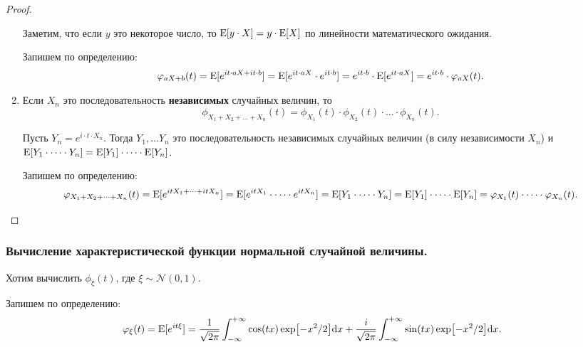 \begin{proof}
\begin{enumerate}
        Заметим, что если $y$ это некоторое число, то $\operatorname{E}[y \cdot X] = y \cdot \operatorname{E}[X]$ по линейности математического ожидания.

        Запишем по определению:
        \begin{align*}
            \varphi_{aX + b}(t)
            = \operatorname{E}[e^{it \cdot aX + it \cdot b}]
            = \operatorname{E}[e^{it \cdot aX} \cdot e^{it \cdot b}]
            = e^{it \cdot b} \cdot \operatorname{E}[e^{it \cdot aX}]
            = e^{it \cdot b} \cdot \varphi_{aX}(t).
        \end{align*}

    \item 
        Если $X_n$ это последовательность \textbf{независимых} случайных величин, то
        \begin{equation*}
            \phi_{X_1 + X_2 + \dots + X_n}(t) = \phi_{X_1}(t) \cdot \phi_{X_2}(t) \cdot \dots \cdot \phi_{X_n}(t).
        \end{equation*}

        Пусть $Y_n = e^{i \cdot t \cdot X_n}$. Тогда $Y_1, \dots Y_n$ это последовательность независимых случайных величин (в силу независимости $X_n$) и $\operatorname{E}[Y_1 \cdot \dots \cdot Y_n] = \operatorname{E}[Y_1] \cdot \dots \cdot \operatorname{E}[Y_n]$.

        Запишем по определению:
        \begin{equation*}
            \varphi_{X_1 + X_2 + \dots + X_n}(t)
            = \operatorname{E}[e^{itX_1 + \dots + itX_n}]
            = \operatorname{E}[e^{itX_1} \cdot \dots \cdot e^{itX_n}]
            = \operatorname{E}[Y_1 \cdot \dots \cdot Y_n]
            = \operatorname{E}[Y_1] \cdot \dots \cdot \operatorname{E}[Y_n]
            = \varphi_{X_1}(t) \cdot \dots \cdot \varphi_{X_n}(t).
        \end{equation*}
    \end{enumerate}
\end{proof}

\subsubsection{Вычисление характеристической функции нормальной случайной величины.}

Хотим вычислить $\phi_{\xi}(t)$, где $\xi \sim \mathcal{N}(0, 1)$.

Запишем по определению:
\begin{equation*}
    \varphi_{\xi}(t) = \operatorname{E}[e^{it \xi}]
    = \dfrac{1}{\sqrt{2 \pi}} \int_{-\infty}^{+\infty} \cos (tx) \exp[-x^2/2] \dd x
    + \dfrac{i}{\sqrt{2 \pi}} \int_{-\infty}^{+\infty} \sin (tx) \exp[-x^2/2] \dd x.
\end{equation*}

